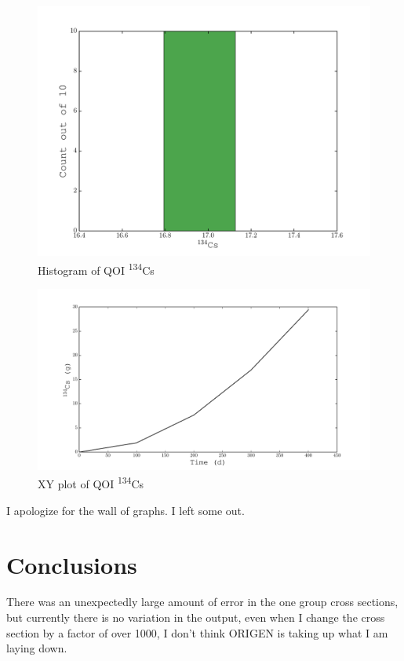 \documentclass[11pt,notitlepage]{article}
\newcommand{\tss}{\textsuperscript}
\begin{document}
  \begin{figure}[H]
    \begin{center}
      \includegraphics[width=0.77\columnwidth]{../Origen2/PLOTS/CS134Post_HIST.pdf}
      \vspace{-5mm}
      \caption{Histogram of QOI \tss{134}Cs}
      \label{fig:POSTHISTBa136}
    \end{center}
  \end{figure}

    \begin{figure}[H]
    \begin{center}
      \includegraphics[width=0.77\columnwidth]{../Origen2/PLOTS/CS134Post_XY.pdf}
      \vspace{-5mm}
      \caption{XY plot of QOI \tss{134}Cs}
      \label{fig:POSTXYCs134}
    \end{center}
  \end{figure}


I apologize for the wall of graphs. I left some out.

\section{Conclusions}

There was an unexpectedly large amount of error in the
one group cross sections, but currently there is no variation
in the output, even when I change the cross section by a
factor of over 1000, I don't think ORIGEN is taking up
what I am laying down.



\end{document}
